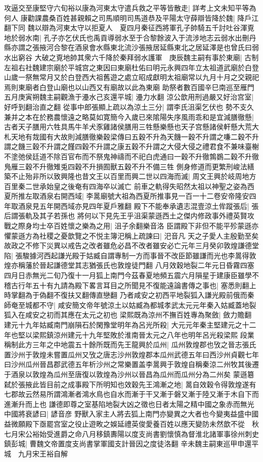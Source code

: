 攻逼交至康堅守六旬裕以康為河東太守遣兵救之平等皆散走|{
	詳考上文未知平等為何人}
康勸課農桑百姓甚親賴之司馬順明司馬道恭及平陽太守薛辯皆降於魏|{
	降戶江翻下同}
魏以辯為河東太守以拒夏人　夏四月秦征西將軍孔子帥騎五千討吐谷渾覔地於弱水南|{
	孔子亦乞伏氏也禹貢導弱水至于合黎餘波入于流涉地志云弱水出刪丹縣亦謂之張掖河合黎在酒泉會水縣東北流沙張掖居延縣東北之居延澤是也曾氏曰弱水出窮谷}
大破之覔地帥其衆六千降於秦拜弱水護軍　庚辰魏主嗣有事於東廟|{
	古制左祖右社魏建宗廟於平城宫之東因曰東廟杜佑曰明元永興四年立太祖道武廟於白登山歲一祭無常月又於白登西大祖舊遊之處立昭成獻明太祖廟常以九月十月之交親祀焉則東廟者白登山廟也以山西又有廟故以此為東廟}
助祭者數百國辛巳南巡至雁門　五月庚寅朔魏主嗣觀漁于灅水己亥還平城|{
	灅力水翻}
涼公歆用刑過嚴又好治宫室|{
	好呼到翻治直之翻}
從事中郎張顯上疏以為涼土三分|{
	謂李氏沮渠乞伏也}
勢不支久兼并之本在於務農懷遠之略莫如寛簡今入歲已來隂陽失序風雨乖和是宜減膳徹懸|{
	古者天子膳用六牲具馬牛羊犬豕雞諸侯膳用三牲懸樂懸也天子宫懸諸侯軒懸大荒大札天地有烖國有大故則減膳徹樂穀梁傳曰五穀不升為天饑一穀不升謂之嗛二穀不升謂之饑三穀不升謂之饉四穀不升謂之康五穀不升謂之大侵大侵之禮君食不兼味臺榭不塗弛侯廷道不除百官布而不祭鬼神禱而不祀白虎通曰一穀不升徹鶉鷃二穀不升徹鳬雁三穀不升徹雉兎四穀不升損囿獸五穀不升不備三牲}
側身修道而更繁刑峻法繕築不止殆非所以致興隆也昔文王以百里而興二世以四海而滅|{
	周文王興於岐周地方百里秦二世承始皇之後奄有四海卒以滅亡}
前車之軌得失昭然太祖以神聖之姿為西夏所推左取酒泉右開西域|{
	李暠廟號大祖為西夏所推事見一百一十二卷安帝隆安四年取酒泉見五年開西域亦見四年夏戶雅翻}
殿下不能奉承遺志混壹涼土侔蹤張后|{
	張后謂張軌及其子若孫也}
將何以下見先王乎沮渠蒙遜西土之傑内修政事外禮英賢攻戰之際身均士卒百姓懷之樂為之用|{
	沮子余翻樂音洛}
臣謂殿下非但不能平殄蒙遜亦懼蒙遜方為社稷之憂歆覽之不悦主簿汜稱上疏諫曰|{
	汜音凡}
天之子愛人主殷勤至矣故政之不修下災異以戒告之改者雖危必昌不改者雖安必亡元年三月癸卯敦煌謙德堂陷|{
	張駿據河西起謙光殿于姑臧自謂專制一方而事晉不改臣節雖謙而光也李暠得敦煌亦稱藩於晉起謙德堂其志猶張氏也敦煌徒門翻}
八月效穀地裂二年元日昏霧四塞四月日赤無光二旬乃復十一月狐上南門今茲春夏地頻五震六月隕星于建康臣雖學不稽古行年五十有九請為殿下畧言耳目之所聞見不復能遠論書傳之事也|{
	塞悉則翻上時掌翻為于偽翻不復扶又翻傳直戀翻}
乃者咸安之初西平地裂狐入謙光殿前俄而秦師奄至城都不守|{
	咸安簡文帝年號涼土以姑臧為都城孝武太元元年秦入姑臧蓋地裂狐入在咸安之初而其應在太元之初也}
梁熙既為涼州不撫百姓專為聚斂|{
	斂力贍翻}
建元十九年姑臧南門崩隕石於閑豫堂明年為呂光所殺|{
	大元元年秦主堅建元之十二年也堅以梁熙鎮涼州建元十九年堅敗於淮南晉太元之八年也明年呂光殺梁熙}
段業稱制此方三年之中地震五十餘所既而先王龍興於瓜州|{
	瓜州敦煌郡也攷之晉志張氏置沙州于敦煌未嘗置瓜州又攷之唐志沙州敦煌郡本瓜州武德五年曰西沙州貞觀七年曰沙州瓜州晉昌郡武德五年析沙州之常樂置盖李暠興于敦煌自稱秦涼二州牧其後遷于酒泉以敦煌為瓜州至唐復以敦煌為沙州以晉昌為瓜州而瓜州分為二州矣}
蒙遜簒弑於張掖此皆目前之成事殿下所明知也效穀先王鴻漸之地|{
	暠自效穀令得敦煌遂有七郡故云然易所謂鴻漸者鴻水鳥也自水而漸于干又漸于磐又漸于陸又漸于木自下而進漸升而上也}
謙德即尊之室基陷地裂大凶之徵也日者太陽之精中國之象赤而無光中國將衰諺曰|{
	諺音彦}
野獸入家主人將去狐上南門亦變異之大者也今變夷益盛中國益微願殿下亟罷宫室之役止遊畋之娛延禮英俊愛養百姓以應天變防未然歆不從　秋七月宋公裕始受進爵之命八月移鎮夀陽以度支尚書劉懷慎為督淮北諸軍事徐州刺史鎮彭城|{
	曹魏文帝置度支尚書掌軍國支計晉因之度徒洛翻}
辛未魏主嗣東巡甲申還平城　九月宋王裕自解

